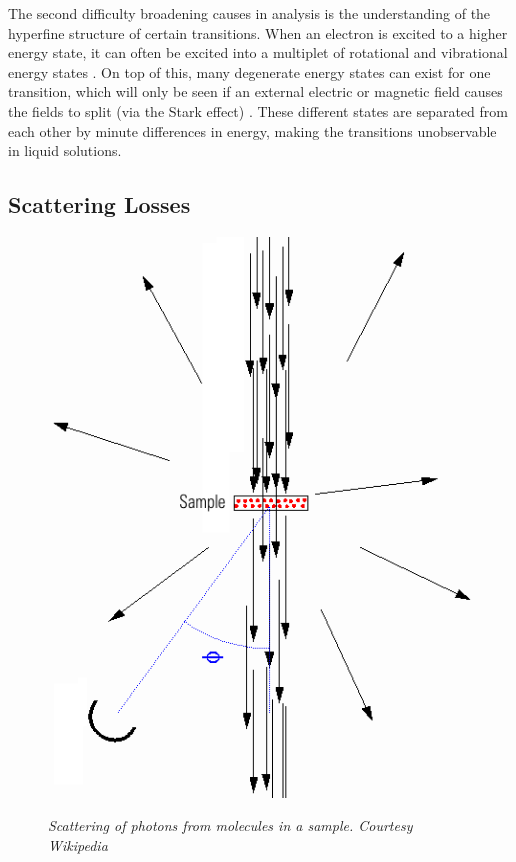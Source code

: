 The second difficulty broadening causes in analysis is the understanding of
the hyperfine structure of certain transitions. When an electron is excited to
a higher energy state, it can often be excited into a multiplet of rotational
and vibrational energy states \cite{Levine:2008uh}. On top of this, many
degenerate energy states can exist for one transition, which will only be seen
if an external electric or magnetic field causes the fields to split (via
the Stark effect) \cite{Condon:1951wd}. These different states are separated
from each other by minute differences in energy, making the transitions
unobservable in liquid solutions.



\subsection{Scattering Losses}\label{subsec:scattering}

\begin{figure}
\begin{center}
  \includegraphics[width=\marginspace]{figures/scatter.png}
\end{center}
\emph{\footnotesize{Scattering of photons from molecules in a sample. Courtesy Wikipedia}}
\end{figure}

